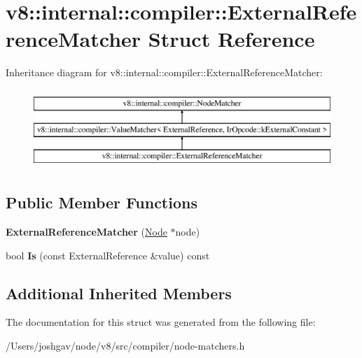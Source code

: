 \hypertarget{structv8_1_1internal_1_1compiler_1_1_external_reference_matcher}{}\section{v8\+:\+:internal\+:\+:compiler\+:\+:External\+Reference\+Matcher Struct Reference}
\label{structv8_1_1internal_1_1compiler_1_1_external_reference_matcher}
Inheritance diagram for v8\+:\+:internal\+:\+:compiler\+:\+:External\+Reference\+Matcher\+:\begin{figure}[H]
\begin{center}
\leavevmode
\includegraphics[height=3.000000cm]{structv8_1_1internal_1_1compiler_1_1_external_reference_matcher}
\end{center}
\end{figure}
\subsection*{Public Member Functions}
\begin{DoxyCompactItemize}
\item 
{\bfseries External\+Reference\+Matcher} (\hyperlink{classv8_1_1internal_1_1compiler_1_1_node}{Node} $\ast$node)\hypertarget{structv8_1_1internal_1_1compiler_1_1_external_reference_matcher_af8d61181c2f48f849215c32c83cc9f9f}{}\label{structv8_1_1internal_1_1compiler_1_1_external_reference_matcher_af8d61181c2f48f849215c32c83cc9f9f}

\item 
bool {\bfseries Is} (const External\+Reference \&value) const \hypertarget{structv8_1_1internal_1_1compiler_1_1_external_reference_matcher_ac4b654e1b1f9829a3148c65982b4cfac}{}\label{structv8_1_1internal_1_1compiler_1_1_external_reference_matcher_ac4b654e1b1f9829a3148c65982b4cfac}

\end{DoxyCompactItemize}
\subsection*{Additional Inherited Members}


The documentation for this struct was generated from the following file\+:\begin{DoxyCompactItemize}
\item 
/\+Users/joshgav/node/v8/src/compiler/node-\/matchers.\+h\end{DoxyCompactItemize}
